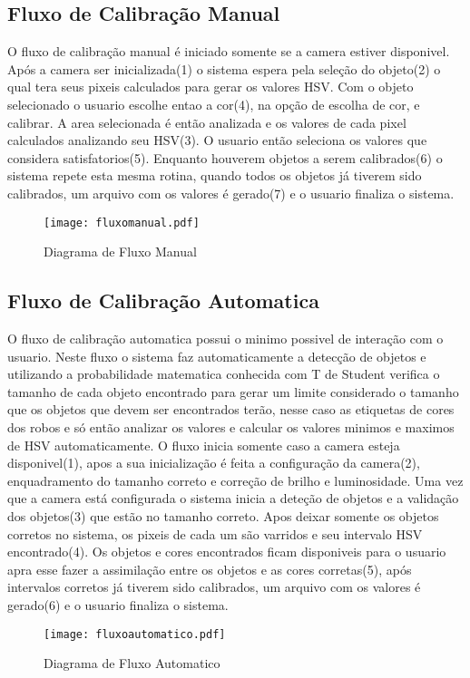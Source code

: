 	\subsection{Fluxo de Calibração Manual}	
 	O fluxo de calibração manual é iniciado somente se a camera estiver disponivel. Após a camera ser inicializada(1) o sistema espera pela seleção do objeto(2) o qual tera seus pixeis calculados para gerar os valores HSV. Com o objeto selecionado o usuario escolhe entao a cor(4), na opção de escolha de cor, e calibrar. A area selecionada é então analizada e os valores de cada pixel calculados analizando seu HSV(3).
 	O usuario então seleciona os valores que considera satisfatorios(5). Enquanto houverem objetos a serem calibrados(6) o sistema repete esta mesma rotina, quando todos os objetos já tiverem sido calibrados, um arquivo com os valores é gerado(7) e o usuario finaliza o sistema.
		\begin{figure}[!h]
				\centering
				\texttt{[image: fluxomanual.pdf]}
				\caption{Diagrama de Fluxo Manual}
				\label{DiagramaDeFluxoManual}
			\end{figure}
	\subsection{Fluxo de Calibração Automatica}	
	O fluxo de calibração automatica possui o minimo possivel de interação com o usuario. Neste fluxo o sistema faz automaticamente a detecção de objetos e utilizando a probabilidade matematica conhecida com T de Student verifica o tamanho de cada objeto encontrado para gerar um limite considerado o tamanho que os objetos que devem ser encontrados terão, nesse caso as etiquetas de cores dos robos e só então analizar os valores e calcular os valores minimos e maximos de HSV automaticamente.	
	O fluxo inicia somente caso a camera esteja disponivel(1), apos a sua inicialização é feita a configuração da camera(2), enquadramento do tamanho correto e correção de brilho e luminosidade. Uma vez que a camera está configurada o sistema inicia a deteção de objetos e a validação dos objetos(3) que estão no tamanho correto. Apos deixar somente os objetos corretos no sistema, os pixeis de cada um são varridos e seu intervalo HSV encontrado(4). Os objetos e cores encontrados ficam disponiveis para o usuario apra esse fazer a assimilação entre os objetos e as cores corretas(5), após intervalos corretos já tiverem sido calibrados, um arquivo com os valores é gerado(6) e o usuario finaliza o sistema.
		\begin{figure}[!h]
				\centering
				\texttt{[image: fluxoautomatico.pdf]}
				\caption{Diagrama de Fluxo Automatico}
				\label{DiagramaDeFluxoAutomatico}
			\end{figure} 
			
